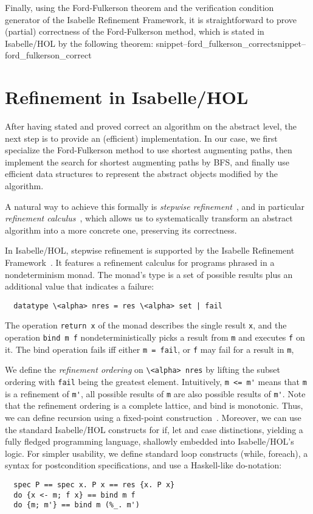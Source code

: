 \documentclass[smallcondensed]{svjour3}     %
\newcommand{\isai}{\lstinline[language=isabelle,basicstyle=\normalsize\ttfamily\slshape]}
\newcommand{\Snippet}[1]{\ifcsname snippet--#1\endcsname\csname snippet--#1\endcsname\else\PackageError{}{No snippet '#1' defined.}{}\fi}
\begin{document}

Finally, using the Ford-Fulkerson theorem and the verification condition generator of the Isabelle Refinement Framework, it is straightforward to prove (partial) correctness of
the Ford-Fulkerson method, which is stated in Isabelle/HOL by the following theorem:
\Snippet{ford_fulkerson_correct}

\section{Refinement in Isabelle/HOL}\label{sec:refinement}
After having stated and proved correct an algorithm on the abstract level, the next step is to provide an (efficient) implementation. 
In our case, we first specialize the Ford-Fulkerson method to use shortest augmenting paths, then implement the search for shortest augmenting paths by BFS, and finally use efficient data structures to represent the abstract objects modified by the algorithm. 

A natural way to achieve this formally is \emph{stepwise refinement}~\cite{Wirth71}, and in particular \emph{refinement calculus}~\cite{Back78,BaWr98}, which allows us to systematically transform an abstract algorithm into a more concrete one, preserving its correctness.

In Isabelle/HOL, stepwise refinement is supported by the Isabelle Refinement Framework~\cite{LaTu12,La12}. 
It features a refinement calculus for programs phrased in a nondeterminism monad. 
The monad's type is a set of possible results plus an additional value that indicates a failure:
\begin{lstlisting}
  datatype \<alpha> nres = res \<alpha> set | fail
\end{lstlisting}
The operation \isai{return x} of the monad describes the single result \isai{x}, and the 
operation \isai{bind m f} nondeterministically picks a result from \isai{m} and executes \isai{f} on it. 
The bind operation fails iff either \isai{m = fail}, or \isai{f} may fail for a result in \isai{m}, 

We define the \emph{refinement ordering} on \isai{\<alpha> nres} by lifting the subset ordering with \isai{fail} being the greatest element.
Intuitively, \isai{m <= m'} means that \isai{m} is a refinement of \isai{m'}, \ie all possible results of \isai{m} are 
also possible results of \isai{m'}. 
Note that the refinement ordering is a complete lattice, and bind is monotonic. Thus, we can define recursion using a fixed-point construction~\cite{Kr10}.
Moreover, we can use the standard Isabelle/HOL constructs for if, let and case distinctions, yielding a fully fledged programming 
language, shallowly embedded into Isabelle/HOL's logic. For simpler usability, we define standard loop constructs (while, foreach), 
a syntax for postcondition specifications, and use a Haskell-like do-notation:
\begin{lstlisting}
  spec P == spec x. P x == res {x. P x}
  do {x <- m; f x} == bind m f
  do {m; m'} == bind m (%_. m')
\end{lstlisting}
\end{document}
